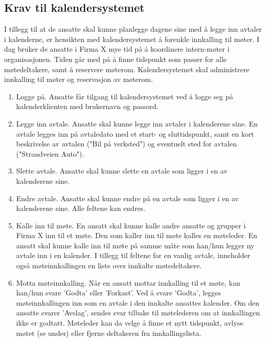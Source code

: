\documentclass[a4paper]{scrartcl}
\begin{document}
\subsection{Krav til kalendersystemet}

I tillegg til at de ansatte skal kunne planlegge dagene sine med å legge inn avtaler i kalenderne, er hensikten med kalendersystemet å forenkle innkalling til møter. I dag bruker de ansatte i Firma X mye tid på å koordinere intern-møter i organisasjonen. Tiden går med på å finne tidspunkt som passer for alle møtedeltakere, samt å reservere møterom. Kalendersystemet skal administrere innkalling til møter og reservasjon av møterom.

\begin{enumerate}

\item
Logge på. Ansatte får tilgang til kalendersystemet ved å logge seg på kalenderklienten med brukernavn og passord.

\item
Legge inn avtale. Ansatte skal kunne legge inn avtaler i kalenderene sine. En avtale legges inn på avtaledato med et start- og sluttidspunkt, samt en kort beskrivelse av avtalen ("Bil på verksted") og eventuelt sted for avtalen ("Strandveien Auto").

\item
Slette avtale. Ansatte skal kunne slette en avtale som ligger i en av kalenderene sine.

\item
Endre avtale. Ansatte skal kunne endre på en avtale som ligger i en av kalenderene sine. Alle feltene kan endres.

\item
Kalle inn til møte. En ansatt skal kunne kalle andre ansatte og grupper i Firma X inn til et møte. Den som kaller inn til møte kalles en møteleder. En ansatt skal kunne kalle inn til møte på samme måte som han/hun legger ny avtale inn i en kalender. I tillegg til feltene for en vanlig avtale, inneholder også møteinnkallingen en liste over innkalte møtedeltakere. 

\item
Motta møteinnkalling. Når en ansatt mottar innkalling til et møte, kan han/hun svare 'Godta' eller 'Forkast'. Ved å svare 'Godta', legges møteinnkallingen inn som en avtale i den innkalte ansattes kalender. Om den ansatte svarer 'Avslag', sendes svar tilbake til møtelederen om at innkallingen ikke er godtatt. Møteleder kan da velge å finne et nytt tidspunkt, avlyse møtet (se under) eller fjerne deltakeren fra innkallingslista.


\end{enumerate}
\end{document}
